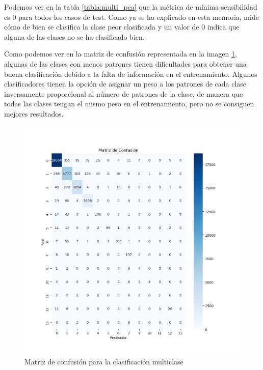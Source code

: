 Podemos ver en la tabla \ref{tabla:multi_pca} que la métrica de mínima sensibilidad es 0 para todos los casos de test. Como ya se ha explicado en esta memoria, mide cómo de bien se clasifica la clase peor clasificada y un valor de 0 indica que alguna de las clases no se ha clasificado bien.

\vspace{1em}

Como podemos ver en la matriz de confusión representada en la imagen \ref{fig:confusion}, algunas de las clases con menos patrones tienen dificultades para obtener una buena clasificación debido a la falta de información en el entrenamiento. Algunos clasificadores tienen la opción de asignar un peso a los patrones de cada clase inversamente proporcional al número de patrones de la clase, de manera que todas las clases tengan el mismo peso en el entrenamiento, pero no se consiguen mejores resultados.

\begin{figure}[H]
	\centering
	\includegraphics[width=1.2\linewidth]{Imagenes/confusion_multiclase}
	\caption[Matriz de confusión para la clasificación multiclase]{Matriz de confusión para la clasificación multiclase}
	\label{fig:confusion}
\end{figure}

